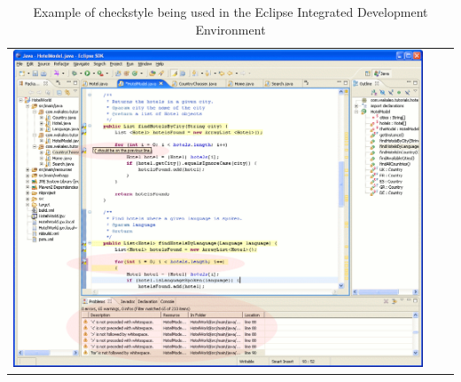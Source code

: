 \begin{table}[htbp]
\begin{tabular}{|c||c|c|}
\hline
\includegraphics[scale=0.45]{15466.png}
\end{tabular}
\caption{Example of checkstyle being used in the Eclipse Integrated Development Environment}
\label{intro-fig3}
\end{table}












